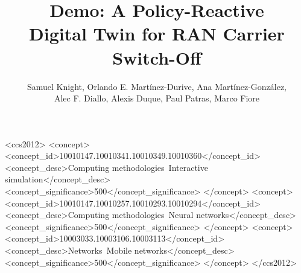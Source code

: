 \documentclass[sigconf, 10pt]{acmart}
\begin{document}
\begin{CCSXML}
<ccs2012>
<concept>
<concept_id>10010147.10010341.10010349.10010360</concept_id>
<concept_desc>Computing methodologies~Interactive simulation</concept_desc>
<concept_significance>500</concept_significance>
</concept>
<concept>
<concept_id>10010147.10010257.10010293.10010294</concept_id>
<concept_desc>Computing methodologies~Neural networks</concept_desc>
<concept_significance>500</concept_significance>
</concept>
<concept>
<concept_id>10003033.10003106.10003113</concept_id>
<concept_desc>Networks~Mobile networks</concept_desc>
<concept_significance>500</concept_significance>
</concept>
</ccs2012>
\end{CCSXML}



\title[Demo: A Policy-Reactive Digital Twin for RAN Carrier Switch-Off]{Demo: A Policy-Reactive\\Digital Twin for RAN Carrier Switch-Off}

\author[S. Knight et al.]{Samuel Knight, Orlando E. Martínez-Durive, Ana Martínez-González,\\
Alec F. Diallo, Alexis Duque, Paul Patras, Marco Fiore}





\maketitle


\vspace{-5pt}
\end{document}
